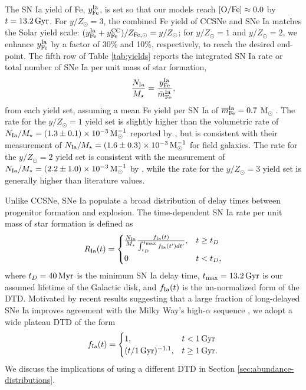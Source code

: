 \documentclass[twocolumn,twocolappendix,linenumbers]{aastex631}
\newcommand{\mathOFe}{{\rm [O/Fe]}}
\newcommand{\yZ}[1]{$y/Z_\odot=#1$}
\begin{document}
The SN Ia yield of Fe, $y_{\rm Fe}^{\rm Ia}$, is set so that our models reach $\mathOFe\approx0.0$ by $t=13.2\,{\rm Gyr}$. For \yZ{3}, the combined Fe yield of CCSNe and SNe Ia matches the Solar yield scale: $(y_{\rm Fe}^{\rm Ia}+y_{\rm Fe}^{\rm CC})/Z_{\rm Fe,\odot}=y/Z_\odot$; for \yZ{1} and \yZ{2}, we enhance $y_{\rm Fe}^{\rm Ia}$ by a factor of 30\% and 10\%, respectively, to reach the desired end-point. The fifth row of Table \ref{tab:yields} reports the integrated SN Ia rate or total number of SNe Ia per unit mass of star formation,
\begin{equation}
    \frac{N_{\rm Ia}}{M_\star} = \frac{y_{\rm Fe}^{\rm Ia}}{\bar m_{\rm Fe}^{\rm Ia}},
    \label{eq:snia-rate}
\end{equation}
from each yield set, assuming a mean Fe yield per SN Ia of $\overline m_{\rm Fe}^{\rm Ia}=0.7$ M$_\odot$ \citep{mazzali_common_2007,howell_effect_2009}. The rate for the \yZ{1} yield set is slightly higher than the volumetric rate of $N_{\rm Ia}/M_\star=(1.3\pm0.1)\times10^{-3}\,{\rm M}_\odot^{-1}$ reported by \citet{maoz_star_2017}, but is consistent with their measurement of $N_{\rm Ia}/M_\star=(1.6\pm0.3)\times10^{-3}\,{\rm M}_\odot^{-1}$ for field galaxies. The rate for the \yZ{2} yield set is consistent with the measurement of $N_{\rm Ia}/M_\star=(2.2\pm1.0)\times10^{-3}\,{\rm M}_\odot^{-1}$ by \citet{maoz_type-ia_2012}, while the rate for the \yZ{3} yield set is generally higher than literature values.

Unlike CCSNe, SNe Ia populate a broad distribution of delay times between progenitor formation and explosion. The time-dependent SN Ia rate per unit mass of star formation is defined as
\begin{equation}
    R_{\rm Ia}(t) = 
    \begin{cases}
        \frac{N_{\rm Ia}}{M_\star}
        \frac{f_{\rm Ia}(t)}{\int_{t_D}^{t_{\rm max}} f_{\rm Ia}(t') dt'}, & t \ge t_D \\
        0 & t < t_D,
    \end{cases}
    \label{eq:dtd-function}
\end{equation}
where $t_D=40\,{\rm Myr}$ is the minimum SN Ia delay time, $t_{\rm max}=13.2\,{\rm Gyr}$ is our assumed lifetime of the Galactic disk, and $f_{\rm Ia}(t)$ is the un-normalized form of the DTD. Motivated by recent results suggesting that a large fraction of long-delayed SNe Ia improves agreement with the Milky Way's high-$\alpha$ sequence \citep{palicio_analytic_2023,dubay_galactic_2024}, we adopt a wide plateau DTD of the form
\begin{equation}
    \label{eq:plateau-dtd}
    f_{\rm Ia}(t) =
    \begin{cases}
        1, & t < 1\,{\rm Gyr} \\
        (t/1\,{\rm Gyr})^{-1.1}, & t \ge 1\,{\rm Gyr}.
    \end{cases}
\end{equation}
We discuss the implications of using a different DTD in Section \ref{sec:abundance-distributions}.
\end{document}
